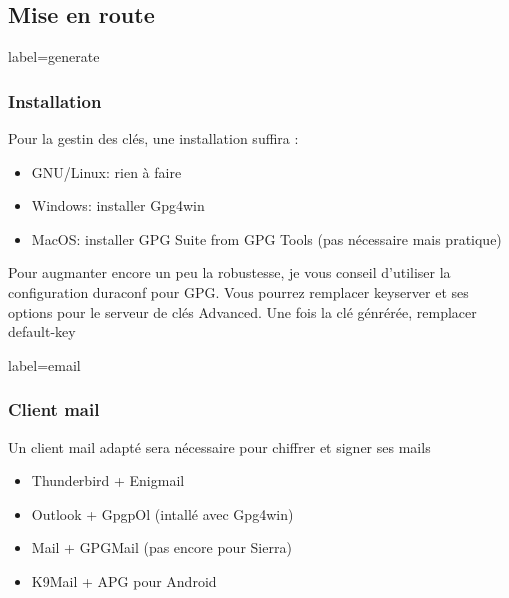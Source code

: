 \documentclass{beamer}
\begin{document}
    \subsection{Mise en route}
        \begin{frame}{label=generate}
            \frametitle{Installation}
            Pour la gestin des clés, une installation suffira \cite{best}:
            \begin{center}
                \begin{itemize}
                    \item GNU/Linux: rien à faire
                    \item Windows: installer Gpg4win
                    \item MacOS: installer GPG Suite from GPG Tools (pas nécessaire mais pratique)
                \end{itemize}
            \end{center}
            \begin{tcolorbox}[colback=green!5,colframe=green!40!black,title=Configuration]
                Pour augmanter encore un peu la robustesse, je vous conseil d'utiliser la configuration duraconf pour GPG.
                Vous pourrez remplacer keyserver et ses options pour le serveur de clés Advanced.
                Une fois la clé génrérée, remplacer default-key
            \end{tcolorbox}
        \end{frame}
        \begin{frame}{label=email}
            \frametitle{Client mail}
            Un client mail adapté sera nécessaire pour chiffrer et signer ses mails
            \begin{center}
                \begin{itemize}
                    \item Thunderbird + Enigmail
                    \item Outlook + GpgpOl (intallé avec Gpg4win)
                    \item Mail + GPGMail (pas encore pour Sierra)
                    \item K9Mail + APG pour Android
                \end{itemize}
            \end{center}
        \end{frame}
\end{document}
